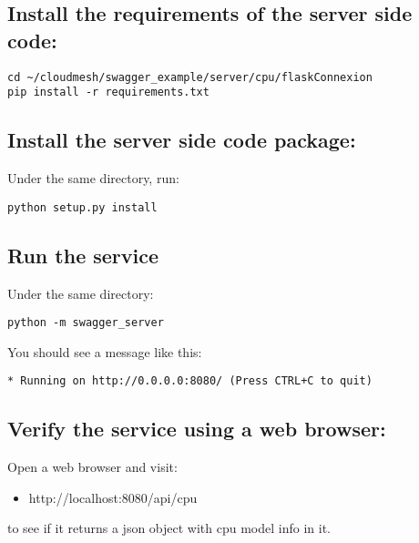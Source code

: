 \subsection{Install the requirements of the server side
code:}\label{install-the-requirements-of-the-server-side-code}

\begin{lstlisting}
cd ~/cloudmesh/swagger_example/server/cpu/flaskConnexion
pip install -r requirements.txt
\end{lstlisting}

\subsection{Install the server side code
package:}\label{install-the-server-side-code-package}

Under the same directory, run:

\begin{lstlisting}
python setup.py install
\end{lstlisting}

\subsection{Run the service}\label{run-the-service}

Under the same directory:

\begin{lstlisting}
python -m swagger_server
\end{lstlisting}

You should see a message like this:

\begin{lstlisting}
* Running on http://0.0.0.0:8080/ (Press CTRL+C to quit)
\end{lstlisting}

\subsection{Verify the service using a web
browser:}\label{verify-the-service-using-a-web-browser}

Open a web browser and visit:

\begin{itemize}
\tightlist
\item
  http://localhost:8080/api/cpu
\end{itemize}

to see if it returns a json object with cpu model info in it.

